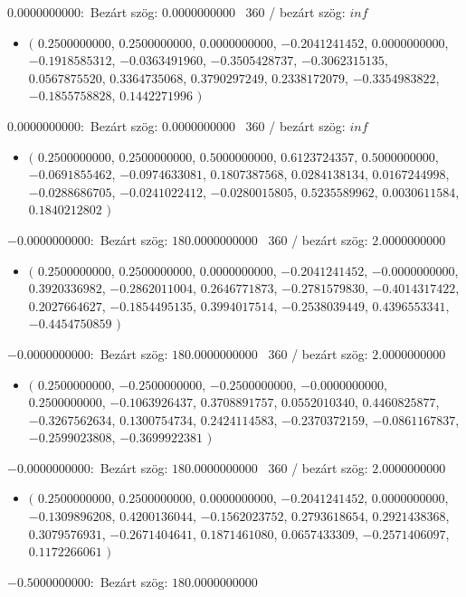 \documentclass[14pt,a4paper]{article}
\begin{document}
$0.0000000000$:\
Bezárt szög: $0.0000000000$ \
360 / bezárt szög: $inf$\
\begin{itemize}
\item
$\big($
$0.2500000000$, $0.2500000000$, $0.0000000000$, $-0.2041241452$, $0.0000000000$, $-0.1918585312$, $-0.0363491960$, $-0.3505428737$, $-0.3062315135$, $0.0567875520$, $0.3364735068$, $0.3790297249$, $0.2338172079$, $-0.3354983822$, $-0.1855758828$, $0.1442271996$
$\big)$
\end{itemize}
$0.0000000000$:\
Bezárt szög: $0.0000000000$ \
360 / bezárt szög: $inf$\
\begin{itemize}
\item
$\big($
$0.2500000000$, $0.2500000000$, $0.5000000000$, $0.6123724357$, $0.5000000000$, $-0.0691855462$, $-0.0974633081$, $0.1807387568$, $0.0284138134$, $0.0167244998$, $-0.0288686705$, $-0.0241022412$, $-0.0280015805$, $0.5235589962$, $0.0030611584$, $0.1840212802$
$\big)$
\end{itemize}
$-0.0000000000$:\
Bezárt szög: $180.0000000000$ \
360 / bezárt szög: $2.0000000000$\
\begin{itemize}
\item
$\big($
$0.2500000000$, $0.2500000000$, $0.0000000000$, $-0.2041241452$, $-0.0000000000$, $0.3920336982$, $-0.2862011004$, $0.2646771873$, $-0.2781579830$, $-0.4014317422$, $0.2027664627$, $-0.1854495135$, $0.3994017514$, $-0.2538039449$, $0.4396553341$, $-0.4454750859$
$\big)$
\end{itemize}
$-0.0000000000$:\
Bezárt szög: $180.0000000000$ \
360 / bezárt szög: $2.0000000000$\
\begin{itemize}
\item
$\big($
$0.2500000000$, $-0.2500000000$, $-0.2500000000$, $-0.0000000000$, $0.2500000000$, $-0.1063926437$, $0.3708891757$, $0.0552010340$, $0.4460825877$, $-0.3267562634$, $0.1300754734$, $0.2424114583$, $-0.2370372159$, $-0.0861167837$, $-0.2599023808$, $-0.3699922381$
$\big)$
\end{itemize}
$-0.0000000000$:\
Bezárt szög: $180.0000000000$ \
360 / bezárt szög: $2.0000000000$\
\begin{itemize}
\item
$\big($
$0.2500000000$, $0.2500000000$, $0.0000000000$, $-0.2041241452$, $0.0000000000$, $-0.1309896208$, $0.4200136044$, $-0.1562023752$, $0.2793618654$, $0.2921438368$, $0.3079576931$, $-0.2671404641$, $0.1871461080$, $0.0657433309$, $-0.2571406097$, $0.1172266061$
$\big)$
\end{itemize}
$-0.5000000000$:\
Bezárt szög: $180.0000000000$ \
\end{document}

